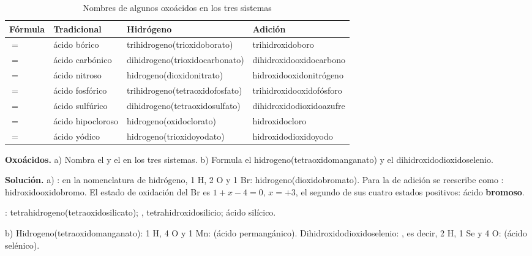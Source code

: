 \begin{table}[H]
    \centering
    \caption{Nombres de algunos oxoácidos en los tres sistemas}
    \vspace{-5pt}
    \small
    \setlength{\tabcolsep}{5pt}
    \begin{tabular}{@{}llL{4.35cm}L{4.1cm}@{}}
        \toprule
        \textbf{Fórmula} & \textbf{Tradicional} & \textbf{Hidrógeno} & \textbf{Adición} \\
        \midrule
         \(=\)  & ácido bórico & trihidrogeno(trioxidoborato) & trihidroxidoboro \\[3pt]
         \(=\)  & ácido carbónico & dihidrogeno(trioxidocarbonato) & dihidroxidooxidocarbono \\[3pt]
         \(=\)  & ácido nitroso & hidrogeno(dioxidonitrato) & hidroxidooxidonitrógeno \\[3pt]
         \(=\)  & ácido fosfórico & trihidrogeno(tetraoxidofosfato) & trihidroxidooxidofósforo \\[3pt]
         \(=\)  & ácido sulfúrico & dihidrogeno(tetraoxidosulfato) & dihidroxidodioxidoazufre \\[3pt]
         \(=\)  & ácido hipocloroso & hidrogeno(oxidoclorato) & hidroxidocloro \\[3pt]
         \(=\)  & ácido yódico & hidrogeno(trioxidoyodato) & hidroxidodioxidoyodo \\
        \bottomrule
    \end{tabular}
    \label{tab:ud5-oxoacidos-nombres}
\end{table}

\begin{example}
    \textbf{Oxoácidos.} a) Nombra el  y el  en los tres sistemas. b) Formula el
    hidrogeno(tetraoxidomanganato) y el dihidroxidodioxidoselenio.

    \textbf{Solución.} a) : en la nomenclatura de hidrógeno, 1 H, 2 O y 1 Br: hidrogeno(dioxidobromato). Para la de
    adición se reescribe como : hidroxidooxidobromo. El estado de oxidación del Br es \(1 + x - 4 = 0\), \(x = +3\),
    el segundo de sus cuatro estados positivos: ácido \textbf{bromoso}.

    : tetrahidrogeno(tetraoxidosilicato); , tetrahidroxidosilicio; ácido silícico.

    b) Hidrogeno(tetraoxidomanganato): 1 H, 4 O y 1 Mn:  (ácido permangánico). Dihidroxidodioxidoselenio:
    , es decir, 2 H, 1 Se y 4 O:  (ácido selénico).
\end{example}


